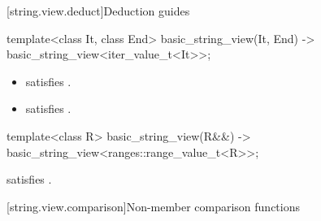 [string.view.deduct]{Deduction guides}

\begin{itemdecl}
template<class It, class End>
  basic_string_view(It, End) -> basic_string_view<iter_value_t<It>>;
\end{itemdecl}

\begin{itemdescr}
\pnum
\constraints
\begin{itemize}
\item {} satisfies .
\item {} satisfies .
\end{itemize}
\end{itemdescr}

\begin{itemdecl}
template<class R>
  basic_string_view(R&&) -> basic_string_view<ranges::range_value_t<R>>;
\end{itemdecl}

\begin{itemdescr}
\pnum
\constraints
{} satisfies .
\end{itemdescr}

[string.view.comparison]{Non-member comparison functions}

